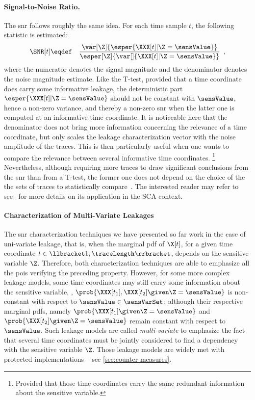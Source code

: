 \paragraph{Signal-to-Noise Ratio.}
The \gls{snr} follows roughly the same idea.
For each time sample \(t\), the following statistic is estimated:
\begin{eqnarray}
	\SNR[t] & \eqdef & 
	\frac{\var[\Z]{\esper{\XXX[t]| \Z = \sensValue}}}
	{\esper[\Z]{\var[]{\XXX[t] | \Z = \sensValue}}} \enspace ,
	\label{eq:SNR}
\end{eqnarray}
where the numerator denotes the signal magnitude and the denominator denotes the noise magnitude estimate.
Like the T-test, provided that a time coordinate does carry some informative leakage, the deterministic part \(\esper{\XXX[t]| \Z = \sensValue}\) should not be constant with \(\sensValue\), hence a non-zero variance, and thereby a non-zero \gls{snr} when the latter one is computed at an informative time coordinate.
It is noticeable here that the denominator does not bring more information concerning the relevance of a time coordinate, but only scales the leakage characterization vector with the noise amplitude of the traces.
This is then particularly useful when one wants to compare the relevance between several informative time coordinates.%
\footnote{
	Provided that those time coordinates carry the same redundant information about the sensitive variable.
}
Nevertheless, although requiring more traces to draw significant conclusions from the \gls{snr} than from a T-test, the former one does not depend on the choice of the the sets of traces to statistically compare~\cite{standaert_welch_2018}.
The interested reader may refer to see~\cite[Sec.~4.3.2]{mangard_power_2007} for more details on its application in the SCA context.


\paragraph{Characterization of Multi-Variate Leakages}
The \gls{snr} characterization techniques we have presented so far work in the case of uni-variate leakage, that is, when the marginal \gls{pdf} of \(\X[t]\), for a given time coordinate \(t \in \llbracket 1, \traceLength \rrbracket\), depends on the sensitive variable \(\Z\).
Therefore, both characterization techniques are able to emphasize all the \glspl{poi} verifying the preceding property.
However, for some more complex leakage models, some time coordinates may still carry some information about the sensitive variable, \ie{}, \(\prob{\XXX[t_1], \XXX[t_2] \given \Z = \sensValue}\) is non-constant with respect to \(\sensValue \in \sensVarSet\);
although their respective marginal \glspl{pdf}, namely \(\prob{\XXX[t_1] \given \Z = \sensValue}\) and \(\prob{\XXX[t_2] \given \Z = \sensValue}\) remain constant with respect to \(\sensValue\).
Such leakage models are called \emph{multi-variate} to emphasize the fact that several time coordinates must be jointly considered to find a dependency with the sensitive variable \(\Z\).
Those leakage models are widely met with protected implementations -- see \autoref{sec:counter-measures}.


